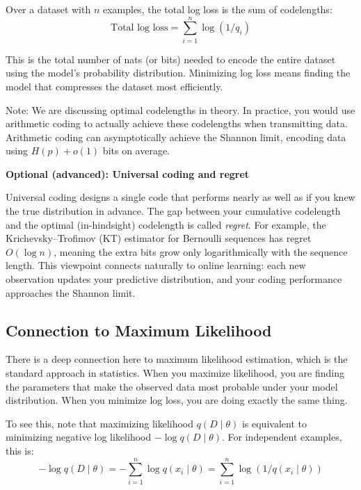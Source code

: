 Over a dataset with $n$ examples, the total log loss is the sum of codelengths:
\begin{equation}
\text{Total log loss} = \sum_{i=1}^{n} \log(1/q_i)
\end{equation}

This is the total number of nats (or bits) needed to encode the entire dataset using the model's probability distribution. Minimizing log loss means finding the model that compresses the dataset most efficiently.

Note: We are discussing optimal codelengths in theory. In practice, you would use arithmetic coding to actually achieve these codelengths when transmitting data. Arithmetic coding can asymptotically achieve the Shannon limit, encoding data using $H(p) + o(1)$ bits on average.

\begin{intuitionbox}
\textbf{Optional (advanced): Universal coding and regret}

Universal coding designs a single code that performs nearly as well as if you knew the true distribution in advance. The gap between your cumulative codelength and the optimal (in-hindsight) codelength is called \emph{regret}. For example, the Krichevsky--Trofimov (KT) estimator for Bernoulli sequences has regret $O(\log n)$, meaning the extra bits grow only logarithmically with the sequence length. This viewpoint connects naturally to online learning: each new observation updates your predictive distribution, and your coding performance approaches the Shannon limit.
\end{intuitionbox}

\subsection{Connection to Maximum Likelihood}

There is a deep connection here to maximum likelihood estimation, which is the standard approach in statistics. When you maximize likelihood, you are finding the parameters that make the observed data most probable under your model distribution. When you minimize log loss, you are doing exactly the same thing.

To see this, note that maximizing likelihood $q(D \mid \theta)$ is equivalent to minimizing negative log likelihood $-\log q(D \mid \theta)$. For independent examples, this is:
\begin{equation}
-\log q(D \mid \theta) = -\sum_{i=1}^{n} \log q(x_i \mid \theta) = \sum_{i=1}^{n} \log(1/q(x_i \mid \theta))
\end{equation}


